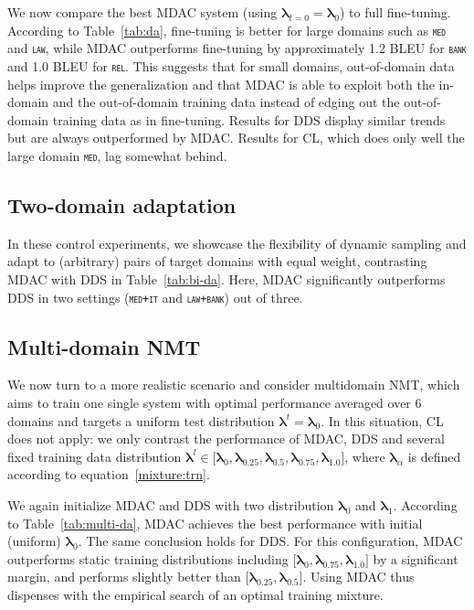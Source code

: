\documentclass[11pt]{article}
\newcommand{\domain}[1]{\texttt{\textsc{#1}}}
\newcommand{\vlambda}{\ensuremath{\boldsymbol\lambda}\xspace} %
\begin{document}
We now compare the best MDAC system (using $\vlambda_{t=0} = \vlambda_0$) to full fine-tuning. According to Table~\ref{tab:da}, fine-tuning is better for large domains such as \domain{med} and \domain{law}, while MDAC outperforms fine-tuning by approximately 1.2 BLEU for \domain{bank} and 1.0 BLEU for \domain{rel}. This suggests that for small domains, out-of-domain data helps improve the generalization and that MDAC is able to exploit both the in-domain and the out-of-domain training data instead of edging out the out-of-domain training data as in fine-tuning. Results for DDS display similar trends but are always outperformed by MDAC. Results for CL, which does only well the large domain \domain{med}, lag somewhat behind.

\subsection{Two-domain adaptation}\label{ssec:bida}

In these control experiments, we showcase the flexibility of dynamic sampling and adapt to (arbitrary) pairs of target domains with equal weight, contrasting MDAC with DDS in Table~\ref{tab:bi-da}. Here, MDAC significantly outperforms DDS in two settings (\domain{med+it} and \domain{law+bank}) out of three.

\subsection{Multi-domain NMT}\label{ssec:mda}

We now turn to a more realistic scenario and consider multidomain NMT, which aims to train one single system with optimal performance averaged over 6 domains and targets a uniform test distribution $\vlambda^t = \vlambda_0$. In this situation, CL \cite{Zhang19curriculum} does not apply: we only contrast the performance of MDAC, DDS and several fixed training data distribution $\vlambda^l \in \big[ \vlambda_0, \vlambda_{0.25}, \vlambda_{0.5}, \vlambda_{0.75}, \vlambda_{1.0}\big]$, where $\vlambda_{\alpha}$ is defined according to equation~\eqref{mixture:trn}.

We again initialize MDAC and DDS with two distribution $\vlambda_0$ and $\vlambda_1$. According to Table~\ref{tab:multi-da}, MDAC achieves the best performance with initial (uniform) $\vlambda_0$. The same conclusion holds for DDS. For this configuration, MDAC outperforms static training distributions including $\big[ \vlambda_0, \vlambda_{0.75}, \vlambda_{1.0}\big]$ by a significant margin, and performs slightly better than $\big[ \vlambda_{0.25}, \vlambda_{0.5} \big]$. Using MDAC thus dispenses with the empirical search of an optimal training mixture.
\end{document}
